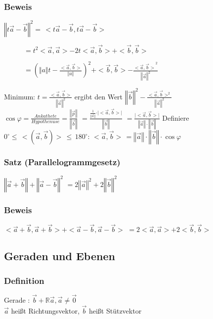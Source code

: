 \subsubsection{Beweis}
$\left\Vert t\vec{a} - \vec{b}\right\Vert^{2} = \, <t\vec{a} - \vec{b}, t\vec{a} - \vec{b}>$
\begin{description}
 \item [\tab] $ = t^{2}<\vec{a}, \vec{a}> - 2t<\vec{a}, \vec{b}> + <\vec{b}, \vec{b}>$
 \item [\tab] $ = \left( \Vert a \Vert t - \frac{<\vec{a}, \vec{b}>}{\Vert a \Vert}\right)^{2} + <\vec{b}, \vec{b}> - \frac{<{\vec{a}, \vec{b}>}^2}{\left\Vert\vec{a}\right\Vert^{2}}$
\end{description}
Minimum: $ t = \frac{<\vec{a}, \vec{b}>}{\left\Vert\vec{a}\right\Vert^2}$
ergibt den Wert $\left\Vert\vec{b}\right\Vert^2 - \frac{<\vec{a}, \vec{b}>^2}{\left\Vert\vec{a}\right\Vert^2}$\\
$\cos\varphi = \frac{Ankathete}{Hypothenuse} = \frac{\left\Vert\vec{p}\right\Vert}{\left\Vert\vec{b}\right\Vert}$
$= \frac{\frac{1}{\Vert\vec{a}\Vert}\cdot\vert<\vec{a}, \vec{b}>\vert}{\left\Vert\vec{b}\right\Vert}$
$= \frac{\vert<\vec{a}, \vec{b}>\vert}{\left\Vert\vec{a}\right\Vert\cdot\left\Vert\vec{b}\right\Vert}$
Definiere $0^{\circ}\leq\, <(\vec{a}, \vec{b})>\, \leq\,  180^{\circ} :\, <\vec{a}, \vec{b}>\, = \left\Vert\vec{a}\right\Vert\cdot\left\Vert\vec{b}\right\Vert\cdot\cos\varphi$
%
%
%
\subsubsection{Satz (Parallelogrammgesetz)}
%
%
$\left\Vert\vec{a} + \vec{b}\right\Vert + \left\Vert\vec{a} - \vec{b}\right\Vert^{2}$
$= 2\left\Vert\vec{a}\right\Vert^2 + 2\left\Vert\vec{b}\right\Vert^2$
%
%
%
\subsubsection{Beweis}
$<\vec{a} + \vec{b}, \vec{a} + \vec{b}> + <\vec{a} -\vec{b}, \vec{a} - \vec{b}>$
$= 2<\vec{a}, \vec{a}> + 2<\vec{b}, \vec{b}>$
%
%
%
\subsection{Geraden und Ebenen}
\subsubsection{Definition}
Gerade : $\vec{b} + \mathbb{R}\vec{a}, \vec{a}\neq\vec{0}$\\
 $\vec{a}$ heißt Richtungsvektor, $\vec{b}$ heißt Stützvektor
%
%
%
%
%
%
